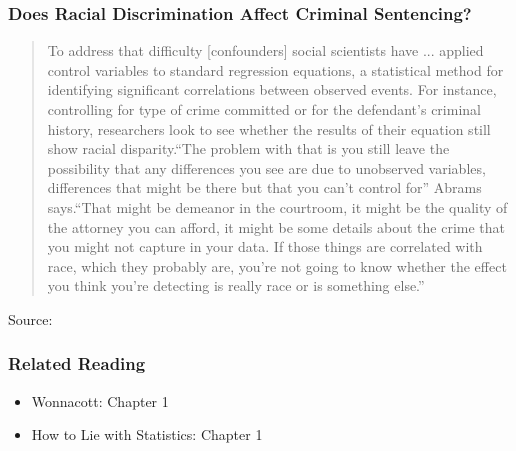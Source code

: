 \documentclass{beamer}
\begin{document}
\begin{frame}
\frametitle{Does Racial Discrimination  Affect Criminal Sentencing?}
	\footnotesize
	\begin{quote}
		To address that difficulty [confounders] social scientists have ... applied control variables to standard regression equations, a statistical method for identifying significant correlations between observed events. For instance, controlling for type of crime committed or for the defendant’s criminal history, researchers look to see whether the results of their equation still show racial disparity.\alert{``The problem with that is you still leave the possibility that any differences you see are due to unobserved variables, differences that might be there but that you can't control for''} Abrams says.``That might be demeanor in the courtroom, it might be the quality of the attorney you can afford, it might be some details about the crime that you might not capture in your data. If those things are correlated with race, which they probably are, you're not going to know whether the effect you think you're detecting is really race or is something else.''
	\end{quote}
	
	\tiny{Source: \href{https://www.law.upenn.edu/live/news/2170-new-study-by-professor-david-s-abrams-confirms}{}}
\end{frame}

\begin{frame}
\frametitle{Related Reading}
	\begin{itemize}
		\item Wonnacott: Chapter 1
		\item How to Lie with Statistics: Chapter 1
	\end{itemize}
\end{frame}

\end{document}
